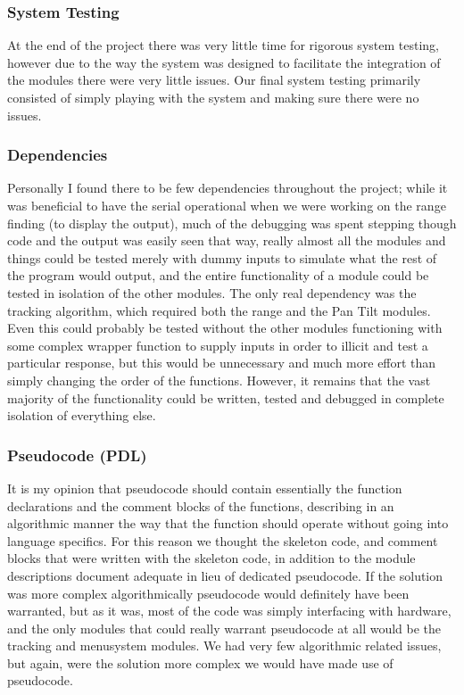 \documentclass[]{report}
\begin{document}
\subsubsection{System Testing}
At the end of the project there was very little time for rigorous system testing, however due to the way the system was designed to facilitate the integration of the modules there were very little issues. Our final system testing primarily consisted of simply playing with the system and making sure there were no issues. 

\subsubsection{Dependencies}
Personally I found there to be few dependencies throughout the project; while it was beneficial to have the serial operational when we were working on the range finding (to display the output), much of the debugging was spent stepping though code and the output was easily seen that way, really almost all the modules and things could be tested merely with dummy inputs to simulate what the rest of the program would output, and the entire functionality of a module could be tested in isolation of the other modules. The only real dependency was the tracking algorithm, which required both the range and the Pan Tilt modules. Even this could probably be tested without the other modules functioning with some complex wrapper function to supply inputs in order to illicit and test a particular response, but this would be unnecessary and much more effort than simply changing the order of the functions. However, it remains that the vast majority of the functionality could be written, tested and debugged in complete isolation of everything else.

\subsubsection{Pseudocode (PDL)}
It is my opinion that pseudocode should contain essentially the function declarations and the comment blocks of the functions, describing in an algorithmic manner the way that the function should operate without going into language specifics. For this reason we thought the skeleton code, and comment blocks that were written with the skeleton code, in addition to the module descriptions document adequate in lieu of dedicated pseudocode. If the solution was more complex algorithmically pseudocode would definitely have been warranted, but as it was, most of the code was simply interfacing with hardware, and the only modules that could really warrant pseudocode at all would be the tracking and menusystem modules. We had very few algorithmic related issues, but again, were the solution more complex we would have made use of pseudocode.
\end{document}
